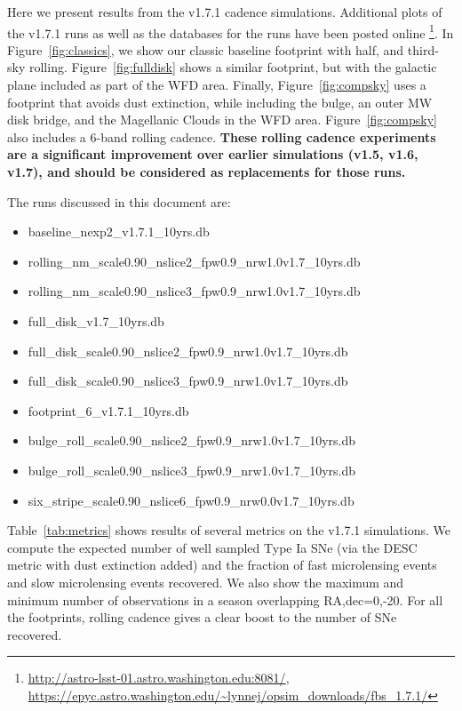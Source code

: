 \documentclass[modern]{aastex62}
\begin{document}
Here we present results from the v1.7.1 cadence simulations. Additional plots of the v1.7.1 runs as well as the databases for the runs have been posted online \footnote{\url{http://astro-lsst-01.astro.washington.edu:8081/}, \url{https://epyc.astro.washington.edu/~lynnej/opsim_downloads/fbs_1.7.1/}}.  In Figure~\ref{fig:classics}, we show our classic baseline footprint with half, and third-sky rolling. Figure~\ref{fig:fulldisk} shows a similar footprint, but with the galactic plane included as part of the WFD area. Finally, Figure~\ref{fig:compsky} uses a footprint that avoids dust extinction, while including the bulge, an outer MW disk bridge, and the Magellanic Clouds in the WFD area. Figure~\ref{fig:compsky} also includes a 6-band rolling cadence.  {\bf{These rolling cadence experiments are a significant improvement over earlier simulations (v1.5, v1.6, v1.7), and should be considered as replacements for those runs.}}

The runs discussed in this document are:
\begin{itemize}
    \item{{baseline\_nexp2\_v1.7.1\_10yrs.db}}
    \item{{rolling\_nm\_scale0.90\_nslice2\_fpw0.9\_nrw1.0v1.7\_10yrs.db}}
    \item{{rolling\_nm\_scale0.90\_nslice3\_fpw0.9\_nrw1.0v1.7\_10yrs.db}}
    \item{{full\_disk\_v1.7\_10yrs.db}}
    \item{{full\_disk\_scale0.90\_nslice2\_fpw0.9\_nrw1.0v1.7\_10yrs.db}}
    \item{{full\_disk\_scale0.90\_nslice3\_fpw0.9\_nrw1.0v1.7\_10yrs.db}}
    \item{{footprint\_6\_v1.7.1\_10yrs.db}}
    \item{{bulge\_roll\_scale0.90\_nslice2\_fpw0.9\_nrw1.0v1.7\_10yrs.db}}
    \item{{bulge\_roll\_scale0.90\_nslice3\_fpw0.9\_nrw1.0v1.7\_10yrs.db}}
    \item{{six\_stripe\_scale0.90\_nslice6\_fpw0.9\_nrw0.0v1.7\_10yrs.db}}
\end{itemize}

Table~\ref{tab:metrics} shows results of several metrics on the v1.7.1 simulations. We compute the expected number of well sampled Type Ia SNe (via the DESC metric with dust extinction added) and the fraction of fast microlensing events and slow microlensing events recovered. We also show the maximum and minimum number of observations in a season overlapping RA,dec=0,-20. For all the footprints, rolling cadence gives a clear boost to the number of SNe recovered.
\end{document}
